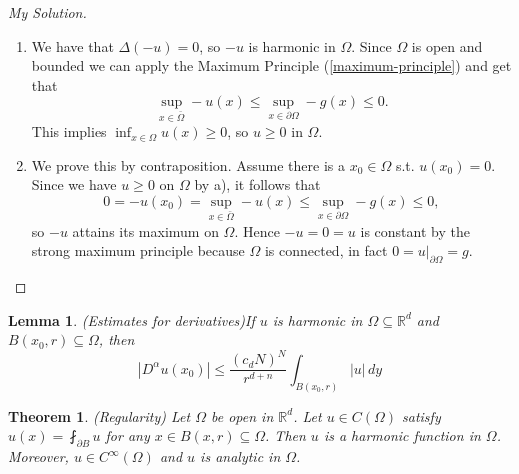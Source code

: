 \documentclass{report}
\theoremstyle{tommy}
\newtheorem{thm}[defn]{Theorem}
\newtheorem{lem}[defn]{Lemma}
\begin{document}
\begin{proof}[My Solution]
  \begin{enumerate}[label=\alph*)]
    \item We have that \(\Delta (-u) = 0\), so \(-u\) is harmonic in \(\Omega\). Since \(\Omega\) is open and bounded we can apply the Maximum Principle (\ref{maximum-principle}) and get that
    \[\sup_{x \in \bar \Omega} -u(x) \le \sup_{x \in \partial \Omega} -g(x) \le 0.\]
    This implies \(\inf_{x \in \Omega} u(x) \ge 0\), so \(u \ge 0\) in \(\Omega\).
    \item We prove this by contraposition. Assume there is a \(x_0 \in \Omega\) s.t. \(u(x_0) = 0\). Since we have \(u \ge 0\) on \(\Omega\) by a), it follows that
    \[0 = -u(x_0) = \sup_{x \in \bar \Omega} -u(x) \le \sup_{x \in \partial \Omega} -g(x) \le 0,\]
    so \(-u\) attains its maximum on \(\Omega\). Hence \(-u = 0 = u\) is constant by the strong maximum principle because \(\Omega\) is connected, in fact \(0 = u|_{\partial \Omega} = g\). \qedhere
  \end{enumerate}
\end{proof}

\begin{lem} (Estimates for derivatives)\label{estimates-of-derivatives} If \(u\) is harmonic in \(\Omega \subseteq \mathbb{R}^d\) and \(B(x_0, r) \subseteq \Omega\), then 
  \[|D^\alpha u(x_0)| \le \frac{(c_d N)^N}{r^{d+n}} \int_{B(x_0, r)} |u| \, dy\]
\end{lem}

\begin{thm} (Regularity)
  Let \(\Omega\) be open in \(\mathbb{R}^d\). Let \(u \in C(\Omega)\) satisfy \(u(x) = \fint_{\partial B} u\) for any \(x \in B(x, r) \subseteq \Omega\). Then \(u\) is a harmonic function in \(\Omega\). Moreover, \(u \in C^\infty(\Omega)\) and \(u\) is analytic in \(\Omega\).
\end{thm}
\end{document}
